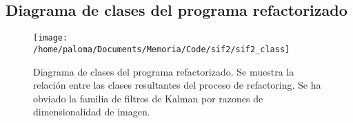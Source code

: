 \begin{appendix}
\pagebreak
\begin{landscape}
\section{Diagrama de clases del programa refactorizado}
\begin{figure}[h!]
\centering
\texttt{[image: /home/paloma/Documents/Memoria/Code/sif2/sif2\_class]}
\caption{Diagrama de clases del programa refactorizado. Se muestra la relaci\'on entre las clases resultantes del proceso de refactoring. Se ha obviado la familia de filtros de Kalman por razones de dimensionalidad de imagen.}
\label{fig:class_sif2}
\end{figure}
\end{landscape}
\end{appendix}

